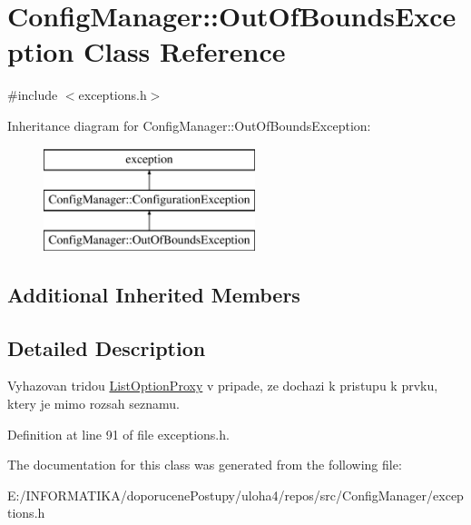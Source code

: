 \hypertarget{class_config_manager_1_1_out_of_bounds_exception}{}\section{Config\+Manager\+:\+:Out\+Of\+Bounds\+Exception Class Reference}
\label{class_config_manager_1_1_out_of_bounds_exception}


{\ttfamily \#include $<$exceptions.\+h$>$}

Inheritance diagram for Config\+Manager\+:\+:Out\+Of\+Bounds\+Exception\+:\begin{figure}[H]
\begin{center}
\leavevmode
\includegraphics[height=3.000000cm]{class_config_manager_1_1_out_of_bounds_exception}
\end{center}
\end{figure}
\subsection*{Additional Inherited Members}


\subsection{Detailed Description}
Vyhazovan tridou \hyperlink{class_config_manager_1_1_list_option_proxy}{List\+Option\+Proxy} v pripade, ze dochazi k pristupu k prvku, ktery je mimo rozsah seznamu. 

Definition at line 91 of file exceptions.\+h.



The documentation for this class was generated from the following file\+:\begin{DoxyCompactItemize}
\item 
E\+:/\+I\+N\+F\+O\+R\+M\+A\+T\+I\+K\+A/doporucene\+Postupy/uloha4/repos/src/\+Config\+Manager/exceptions.\+h\end{DoxyCompactItemize}
